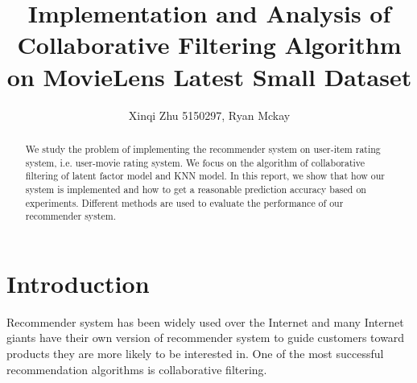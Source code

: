 \documentclass[12pt]{article}
\title{Implementation and Analysis of Collaborative Filtering Algorithm on MovieLens Latest Small Dataset}
\author{Xinqi Zhu 5150297, Ryan Mckay}
\begin{document}
 

\maketitle


\begin{abstract}
We study the problem of implementing the recommender system on user-item rating system, i.e. user-movie rating system. We focus on the algorithm of collaborative filtering of latent factor model and KNN model. In this report, we show that how our system is implemented and how to get a reasonable prediction accuracy based on experiments. Different methods are used to evaluate the performance of our recommender system.
\end{abstract}



\section{Introduction}

Recommender system has been widely used over the Internet and many Internet giants have their own version of recommender system to guide customers toward products they are more likely to be interested in. One of the most successful recommendation algorithms is collaborative filtering.

%
\end{document}
